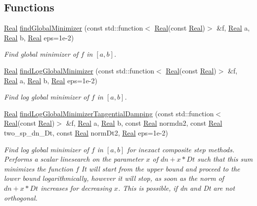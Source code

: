\subsection*{Functions}
\begin{DoxyCompactItemize}
\item 
\hyperlink{classSpacy_1_1Real}{Real} \hyperlink{namespaceSpacy_1_1Scalar_ae3d9bbc5d6c84eafb70737dd8a96251c}{find\-Global\-Minimizer} (const std\-::function$<$ \hyperlink{classSpacy_1_1Real}{Real}(const \hyperlink{classSpacy_1_1Real}{Real})$>$ \&f, \hyperlink{classSpacy_1_1Real}{Real} a, \hyperlink{classSpacy_1_1Real}{Real} b, \hyperlink{classSpacy_1_1Real}{Real} eps=1e-\/2)
\begin{DoxyCompactList}\small\item\em Find global minimizer of $f$ in $[a,b]$. \end{DoxyCompactList}\item 
\hyperlink{classSpacy_1_1Real}{Real} \hyperlink{namespaceSpacy_1_1Scalar_a4692ea99ec81e957a20415d52659fd42}{find\-Log\-Global\-Minimizer} (const std\-::function$<$ \hyperlink{classSpacy_1_1Real}{Real}(const \hyperlink{classSpacy_1_1Real}{Real})$>$ \&f, \hyperlink{classSpacy_1_1Real}{Real} a, \hyperlink{classSpacy_1_1Real}{Real} b, \hyperlink{classSpacy_1_1Real}{Real} eps=1e-\/2)
\begin{DoxyCompactList}\small\item\em Find log global minimizer of $f$ in $[a,b]$. \end{DoxyCompactList}\item 
\hyperlink{classSpacy_1_1Real}{Real} \hyperlink{namespaceSpacy_1_1Scalar_aafb39f9f92f5f3186c3c2c9c5ce0eced}{find\-Log\-Global\-Minimizer\-Tangential\-Damping} (const std\-::function$<$ \hyperlink{classSpacy_1_1Real}{Real}(const \hyperlink{classSpacy_1_1Real}{Real})$>$ \&f, \hyperlink{classSpacy_1_1Real}{Real} a, \hyperlink{classSpacy_1_1Real}{Real} b, const \hyperlink{classSpacy_1_1Real}{Real} normdn2, const \hyperlink{classSpacy_1_1Real}{Real} two\-\_\-sp\-\_\-dn\-\_\-\-Dt, const \hyperlink{classSpacy_1_1Real}{Real} norm\-Dt2, \hyperlink{classSpacy_1_1Real}{Real} eps=1e-\/2)
\begin{DoxyCompactList}\small\item\em Find log global minimizer of $f$ in $[a,b]$ for inexact composite step methods. Performs a scalar linesearch on the parameter $ x $ of $ dn+x*Dt $ such that this sum minimizes the function $ f $ It will start from the upper bound and proceed to the lower bound logarithmically, however it will stop, as soon as the norm of $ dn+x*Dt $ increases for decreasing $ x $. This is possible, if dn and Dt are not orthogonal. \end{DoxyCompactList}\end{DoxyCompactItemize}


